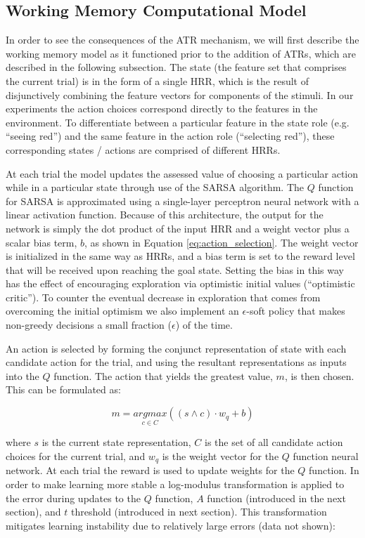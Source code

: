 \documentclass[10pt,letterpaper]{article}
\begin{document}
\subsection{Working Memory Computational Model}

In order to see the consequences of the ATR mechanism, we will first describe the working memory model as it functioned prior to the addition of ATRs, which are described in the following subsection. The state (the feature set that comprises the current trial) is in the form of a single HRR, which is the result of disjunctively combining the feature vectors for components of the stimuli. In our experiments the action choices correspond directly to the features in the environment. To differentiate between a particular feature in the state role (e.g. ``seeing red'') and the same feature in the action role (``selecting red''), these corresponding states / actions are comprised of different HRRs.

At each trial the model updates the assessed value of choosing a particular action while in a particular state through use of the SARSA algorithm. The $ Q $ function for SARSA is approximated using a single-layer perceptron neural network with a linear activation function. Because of this architecture, the output for the network is simply the dot product of the input HRR and a weight vector plus a scalar bias term, $b$, as shown in Equation \ref{eq:action_selection}. The weight vector is initialized in the same way as HRRs, and a bias term is set to the reward level that will be received upon reaching the goal state. Setting the bias in this way has the effect of encouraging exploration via optimistic initial values (``optimistic critic''). To counter the eventual decrease in exploration that comes from overcoming the initial optimism we also implement an $ \epsilon $-soft policy that makes non-greedy decisions a small fraction ($\epsilon$) of the time.  

An action is selected by forming the conjunct representation of state with each candidate action for the trial, and using the resultant representations as inputs into the $ Q $ function. The action that yields the greatest value, $m$, is then chosen. This can be formulated as:

\begin{equation}
m = \underset{c \in C}{argmax}((s \wedge c) \cdot w_{q}+b)
\label{eq:action_selection}
\end{equation}

\noindent where $ s $ is the current state representation, $ C $ is the set of all candidate action choices for the current trial, and $ w_{q} $ is the weight vector for the $ Q $ function neural network. At each trial the reward is used to update weights for the $Q$ function. In order to make learning more stable a log-modulus transformation \cite{john_alternative_1980} is applied to the error during updates to the $ Q $ function, $ A $ function (introduced in the next section), and $t$ threshold (introduced in next section). This transformation mitigates learning instability due to relatively large errors (data not shown):
\end{document}
